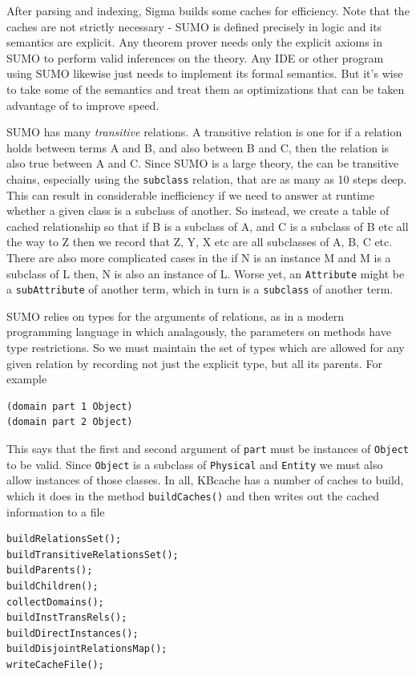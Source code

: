 \documentclass{book}
\begin{document}
After parsing and indexing, Sigma builds some caches for efficiency.  Note that
the caches are not strictly necessary - SUMO is defined precisely in logic and its
semantics are explicit.  Any theorem prover needs only the explicit axioms in SUMO
to perform valid inferences on the theory.  Any IDE or other program using SUMO likewise
just needs to implement its formal semantics.  But it's wise to take some of the semantics and
treat them as optimizations that can be taken advantage of to improve speed.

SUMO has many
\textit{transitive} relations.  A transitive relation is one for if a relation holds
between terms A and B, and also between B and C, then the relation is also true between
A and C.  Since SUMO is a large theory, the can be transitive chains, especially using the
\texttt{subclass} relation, that are as many as 10 steps deep.  This can result in
considerable inefficiency if we need to answer at runtime whether a given class is a subclass
of another.  So instead, we create a table of cached relationship so that if B is a subclass of
A, and C is a subclass of B etc all the way to Z then we record that Z, Y, X etc are all subclasses
of A, B, C etc.  There are also more complicated cases in the if N is an instance M and M is
a subclass of L then, N is also an instance of L.  Worse yet, an \texttt{Attribute} might be a 
\texttt{subAttribute} of another term, which in turn is a \texttt{subclass} of another term.

SUMO relies on types for the arguments of relations, as in a modern programming language in which
analagously, the parameters on methods have type restrictions.  So we must maintain the set of
types which are allowed for any given relation by recording not just the explicit type, but all
its parents.  For example

\begin{lstlisting}[basicstyle=\ttfamily\small\bfseries]
(domain part 1 Object)	
(domain part 2 Object)
\end{lstlisting}

This says that the first and second argument of \texttt{part} must be instances of \texttt{Object}
to be valid.  Since \texttt{Object} is a subclass of \texttt{Physical} and \texttt{Entity} we must
also allow instances of those classes.  In all, KBcache has a number of caches to build, which it
does in the method \texttt{buildCaches()} and then writes out the cached information to a file

\begin{lstlisting}[basicstyle=\ttfamily\small\bfseries]
buildRelationsSet();
buildTransitiveRelationsSet();
buildParents();
buildChildren(); 
collectDomains();
buildInstTransRels();
buildDirectInstances();
buildDisjointRelationsMap(); 
writeCacheFile();
\end{lstlisting}
\end{document}
